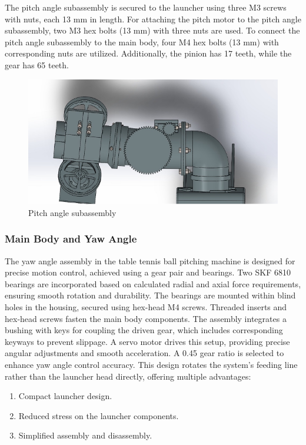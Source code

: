 \documentclass[12pt]{article}
\begin{document}
The pitch angle subassembly is secured to the launcher using three M3 screws with nuts, each 13 mm in length. For attaching the pitch motor to the pitch angle subassembly, two M3 hex bolts (13 mm) with three nuts are used. To connect the pitch angle subassembly to the main body, four M4 hex bolts (13 mm) with corresponding nuts are utilized. Additionally, the pinion has 17 teeth, while the gear has 65 teeth.

\begin{figure}[h!]
    \centering
    \includegraphics[width=0.7\linewidth]{2.3.2.png}
    \caption{Pitch angle subassembly}
    \label{fig:enter-label}
\end{figure}


\subsubsection{Main Body and Yaw Angle}

The yaw angle assembly in the table tennis ball pitching machine is designed for precise motion control, achieved using a gear pair and bearings. Two SKF 6810 bearings are incorporated based on calculated radial and axial force requirements, ensuring smooth rotation and durability. The bearings are mounted within blind holes in the housing, secured using hex-head M4 screws. Threaded inserts and hex-head screws fasten the main body components.
The assembly integrates a bushing with keys for coupling the driven gear, which includes corresponding keyways to prevent slippage. A servo motor drives this setup, providing precise angular adjustments and smooth acceleration. A 0.45 gear ratio is selected to enhance yaw angle control accuracy.
This design rotates the system's feeding line rather than the launcher head directly, offering multiple advantages:

\begin{enumerate}
    \item Compact launcher design.
    \item Reduced stress on the launcher components.
    \item Simplified assembly and disassembly.
\end{enumerate}
\end{document}
